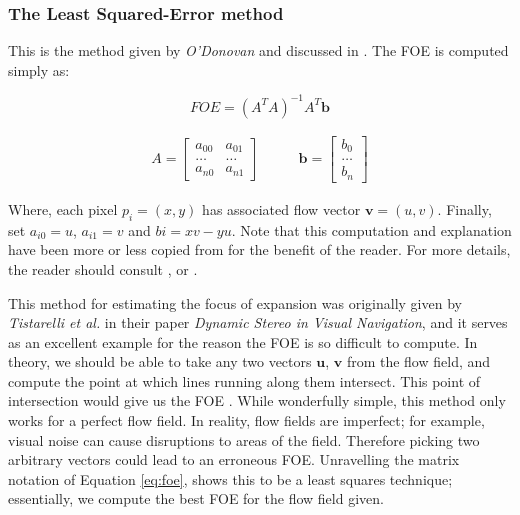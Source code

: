 \documentclass[a4paper,11pt,twoside,openright]{article}
\begin{document}
\subsubsection{The Least Squared-Error method}
This is the method given by \textit{O'Donovan} and discussed in
\cite{Mitchell2018}. The FOE is computed simply as:

\begin{equation}
  \label{eq:foe}
  FOE = (A^TA)^{-1}A^T\mathbf{b}
\end{equation}

\begin{equation*}
  \begin{split}
 A =
\begin{bmatrix}
  a_{00} & a_{01}\\
  \dots  & \dots \\
  a_{n0} &  a_{n1}
\end{bmatrix}
\qquad
\end{split}
\begin{split}
\mathbf{b} =
\begin{bmatrix}
  b_0 \\
  \dots \\
  b_n
\end{bmatrix}
\end{split}
\end{equation*}
\newline

Where, each pixel $p_i = (x, y)$ has associated flow vector $\mathbf{v} = (u,v)$.
Finally, set $a_{i0} = u$, $a_{i1} = v$ and $b{i} = xv - yu$. Note that this
computation and explanation have been more or less copied from
\cite{Mitchell2018} for the benefit of the reader. For more details, the reader
should consult \cite{Mitchell2018}, or \cite{ODonovan2005}.
\newline
\par

This method for estimating the focus of expansion was originally given by
\textit{Tistarelli et al.} in their paper
\textit{Dynamic Stereo in Visual Navigation}\cite{Tistarelli1991, ODonovan2005},
and it serves as an excellent example for the reason the FOE is so difficult to
compute. In theory, we should be able to take any two vectors $\mathbf{u}$,
$\mathbf{v}$ from the flow field, and compute the point at which lines
running along them intersect. This point of intersection would give us the
FOE \cite{ODonovan2005}. While wonderfully simple, this method only works for
a perfect flow field. In reality, flow fields are imperfect; for example,
visual noise can cause disruptions to areas of the field. Therefore picking two
arbitrary vectors could lead to an erroneous FOE. Unravelling the matrix notation
of Equation \ref{eq:foe}, shows this to be a least squares technique;
essentially, we compute the best FOE for the flow field given.
\end{document}
